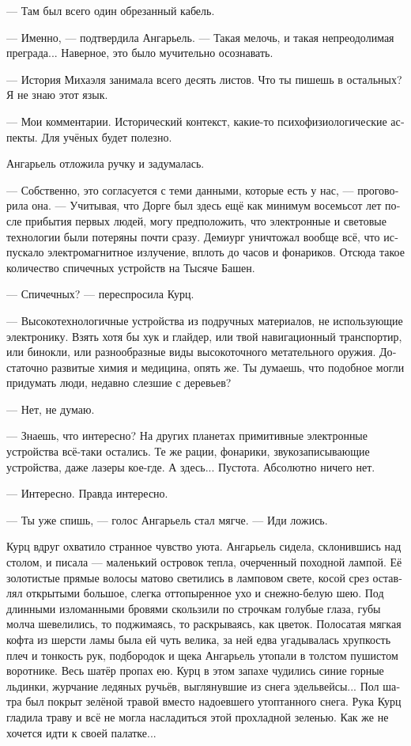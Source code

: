 \documentclass[a4paper,12pt,fleqn]{book}\usepackage{polyglossia}\setdefaultlanguage[babelshorthands=true]{russian}\setotherlanguage{english}\defaultfontfeatures{Ligatures=TeX,Mapping=tex-text}\usepackage{xcolor}\newcommand{\ml}[3]{#2}
\begin{document}
--- Там был всего один обрезанный кабель.

--- Именно, --- подтвердила Ангарьель.
--- Такая мелочь, и такая непреодолимая преграда...
Наверное, это было мучительно осознавать.

--- История Михаэля занимала всего десять листов.
Что ты пишешь в остальных?
Я не знаю этот язык.

--- Мои комментарии.
Исторический контекст, какие-то психофизиологические аспекты.
Для учёных будет полезно.

Ангарьель отложила ручку и задумалась.

--- Собственно, это согласуется с теми данными, которые есть у нас, --- проговорила она.
--- Учитывая, что Дорге был здесь ещё как минимум восемьсот лет после прибытия первых людей, могу предположить, что электронные и световые технологии были потеряны почти сразу.
Демиург уничтожал вообще всё, что испускало электромагнитное излучение, вплоть до часов и фонариков.
Отсюда такое количество спичечных устройств на Тысяче Башен.

--- Спичечных? --- переспросила Курц.

--- Высокотехнологичные устройства из подручных материалов, не использующие электронику.
Взять хотя бы хук и глайдер, или твой навигационный транспортир, или бинокли, или разнообразные виды высокоточного метательного оружия.
Достаточно развитые химия и медицина, опять же.
Ты думаешь, что подобное могли придумать люди, недавно слезшие с деревьев?

--- Нет, не думаю.

--- Знаешь, что интересно?
На других планетах примитивные электронные устройства всё-таки остались.
Те же рации, фонарики, звукозаписывающие устройства, даже лазеры кое-где.
А здесь...
Пустота.
Абсолютно ничего нет.

--- Интересно.
Правда интересно.

--- Ты уже спишь, --- голос Ангарьель стал мягче.
--- Иди ложись.

Курц вдруг охватило странное чувство уюта.
Ангарьель сидела, склонившись над столом, и писала --- маленький островок тепла, очерченный походной лампой.
Её золотистые прямые волосы матово светились в ламповом свете, косой срез оставлял открытыми большое, слегка оттопыренное ухо и снежно-белую шею.
Под длинными изломанными  бровями скользили по строчкам голубые глаза, губы молча шевелились, то поджимаясь, то раскрываясь, как цветок.
Полосатая мягкая кофта из шерсти ламы была ей чуть велика, за ней едва угадывалась хрупкость плеч и тонкость рук, подбородок и щека Ангарьель утопали в толстом пушистом воротнике.
Весь шатёр пропах ею.
Курц в этом запахе чудились синие горные льдинки, журчание ледяных ручьёв, выглянувшие из снега эдельвейсы...
Пол шатра был покрыт зелёной травой вместо надоевшего утоптанного снега.
Рука Курц гладила траву и всё не могла насладиться этой прохладной зеленью.
Как же не хочется идти к своей палатке...
\end{document}
